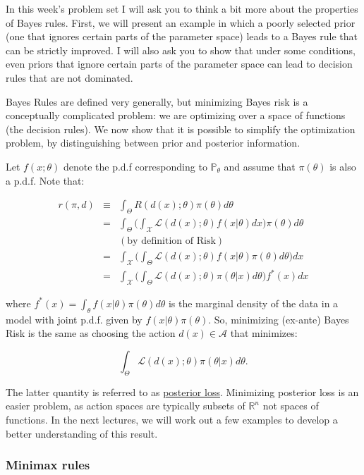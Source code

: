 \documentclass[11pt]{article} %
\begin{document}
In this week’s problem set I will ask you to think a bit more about the properties of Bayes rules. First, we will present an example in which a poorly selected prior (one that ignores certain parts of the parameter space) leads to a Bayes rule that can be strictly improved. I will also ask you to show that under some conditions, even priors that ignore certain parts of the parameter space can lead to decision rules that are not dominated. 

Bayes Rules are defined very generally, but minimizing Bayes risk is a conceptually complicated problem: we are optimizing over a space of functions (the decision rules). We now show that it is possible to simplify the optimization problem, by distinguishing between prior and posterior information. 

Let $f(x;\theta)$ denote the p.d.f corresponding to $\mathbb{P}_{\theta}$ and assume that $\pi(\theta)$ is also a p.d.f. Note that:

\begin{eqnarray*}
r(\pi, d) &\equiv& \int_{\Theta} R(d(x); \theta ) \pi(\theta) d{\theta} \\
&=&  \int_{\Theta}\Big( \int_{\mathcal{X}} \mathcal{L}(d(x); \theta) f(x| \theta) d x  \Big)  \pi(\theta) d{\theta} \\
&& (\textrm{by definition of Risk}) \\
&=& \int_{\mathcal{X}}   \Big( \int_{\Theta} \mathcal{L}(d(x); \theta) f(x| \theta) \pi(\theta) d \theta  \Big)   dx \\
&=& \int_{\mathcal{X}}   \Big( \int_{\Theta} \mathcal{L}(d(x); \theta)\pi (\theta | x) d \theta  \Big) f^*(x)  dx
\end{eqnarray*}

\noindent where $f^*(x)= \int_{\theta} f(x|\theta) \pi(\theta) d \theta$ is the marginal density of the data in a model with joint p.d.f. given by $f(x|\theta) \pi(\theta)$. So, minimizing (ex-ante) Bayes Risk is the same as choosing the action $d(x) \in \mathcal{A}$ that minimizes: 

\[ \int_{\Theta} \mathcal{L}(d(x); \theta)\pi (\theta | x) d \theta.  \] 

\noindent The latter quantity is referred to as \underline{posterior loss}. Minimizing posterior loss is an easier problem, as action spaces are typically subsets of $\mathbb{R}^{n}$ not spaces of functions. In the next lectures, we will work out a few examples to develop a better understanding of this result. 

\subsubsection{Minimax rules} 
\end{document}
